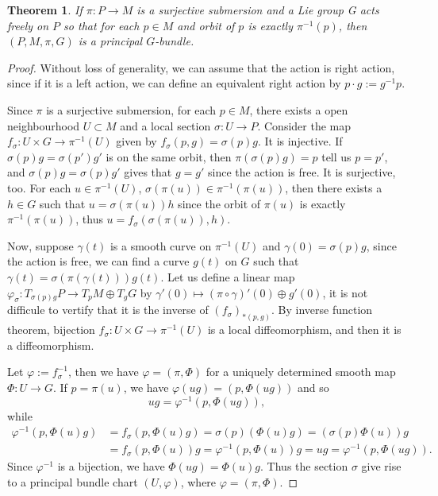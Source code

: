 \documentclass[11pt]{article}
\theoremstyle{definition}
\theoremstyle{plain}
\newtheorem{thm}[para]{Theorem}
\begin{document}

\begin{thm}
If $\pi:P\to M$ is a surjective submersion and a Lie group G acts freely on $P$ so that for each $p\in M$ and orbit of $p$ is exactly $\pi^{-1}(p)$, then $(P,M,\pi,G)$ is a principal $G$-bundle.
\end{thm}

\begin{proof}
	Without loss of generality, we can assume that the action is right action, since if it is a left action, we can define an equivalent right action by $p\cdot g:=g^{-1}p$.
	
	Since $\pi$ is a surjective submersion, for each $p\in M$, there exists a open neighbourhood $U\subset M$ and a local section $\sigma:U\to P$. Consider the map $f_\sigma:U\times G\to \pi^{-1}(U)$ given by $f_\sigma(p,g)=\sigma(p)g$. It is injective. If $\sigma(p)g=\sigma(p')g'$ is on the same orbit, then $\pi(\sigma(p)g)=p$ tell us $p=p'$, and $\sigma(p)g=\sigma(p)g'$ gives that $g=g'$ since the action is free. It is surjective, too. For each $u\in \pi^{-1}(U)$, $\sigma(\pi(u))\in \pi^{-1}(\pi(u))$, then there exists a $h\in G$ such that $u = \sigma(\pi(u))h$ since the orbit of $\pi(u)$ is exactly $\pi^{-1}(\pi(u))$, thus $u= f_\sigma(\sigma(\pi(u)),h)$.
	
	Now, suppose $\gamma(t)$ is a smooth curve on $\pi^{-1}(U)$ and $\gamma(0)=\sigma(p)g$, since the action is free, we can find a curve $g(t)$ on $G$ such that $\gamma(t)=\sigma(\pi(\gamma(t)))g(t)$. Let us define a linear map $\varphi_\sigma: T_{\sigma(p)g}P\to T_{p}M\oplus T_{g}G$ by $\gamma'(0) \mapsto (\pi\circ \gamma)'(0)\oplus g'(0)$, it is not difficule to vertify that it is the inverse of $(f_\sigma)_{*(p,g)}$. By inverse function theorem, bijection $f_\sigma:U\times G\to \pi^{-1}(U)$ is a local diffeomorphism, and then it is a diffeomorphism.
	
	Let $\varphi:=f_\sigma^{-1}$, then we have $\varphi=(\pi,\Phi)$ for a uniquely determined smooth map $\Phi:U\to G$. If $p=\pi(u)$, we have $\varphi(ug)=(p,\Phi(ug))$ and so
	\[
		ug=\varphi^{-1}(p,\Phi(ug)),
	\]
	while
	\[
	\begin{aligned}
		\varphi^{-1}(p,\Phi(u)g)&=f_\sigma(p,\Phi(u)g)=\sigma(p)(\Phi(u)g)=(\sigma(p)\Phi(u))g\\
		&=f_\sigma(p,\Phi(u))g=\varphi^{-1}(p,\Phi(u))g=ug=\varphi^{-1}(p,\Phi(ug)).
	\end{aligned}
	\]
	Since $\varphi^{-1}$ is a bijection, we have $\Phi(ug)=\Phi(u)g$. Thus the 	section $\sigma$ give rise to a principal bundle chart $(U,\varphi)$, where $\varphi=(\pi,\Phi)$.
\end{proof}
\end{document}
